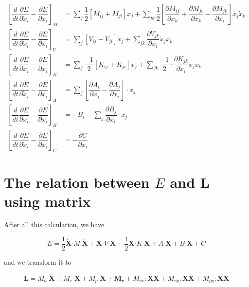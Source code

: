 \documentclass[a4paper]{article}
\newcommand{\vvector}[1]{\pmb{#1}}
\newcommand{\tensor}[1]{#1}
\newcommand{\inner}{\pmb{\cdot}}
\newcommand{\dinner}{\pmb{:}}
\begin{document}
\begin{align*}
\left[\dfrac{d}{dt} \dfrac{\partial E}{\partial \dot{x}_{i}} - \dfrac{\partial E}{\partial x_{i}}\right]_{M} & = \sum_{j} \dfrac{1}{2}\left[M_{ij}+M_{ji}\right] \ddot{x}_{j} + \sum_{jk} \dfrac{1}{2} \left[\dfrac{\partial M_{ij}}{\partial x_{k}} + \dfrac{\partial M_{ji}}{\partial x_{k}} - \dfrac{\partial M_{jk}}{\partial x_{i}}\right] \dot{x}_{j} \dot{x}_{k} \\
\left[\dfrac{d}{dt} \dfrac{\partial E}{\partial \dot{x}_{i}} - \dfrac{\partial E}{\partial x_{i}}\right]_{V} & = \sum_{j} \left[V_{ij}-V_{ji}\right] \dot{x}_{j} + \sum_{jk} \dfrac{\partial V_{jk}}{\partial x_{i}} \dot{x}_{j} x_{k} \\
\left[\dfrac{d}{dt} \dfrac{\partial E}{\partial \dot{x}_{i}} - \dfrac{\partial E}{\partial x_{i}}\right]_{K} & = \sum_{j} \dfrac{-1}{2} \left[K_{ij}+K_{ji}\right] x_{j} + \sum_{jk} \dfrac{-1}{2} \cdot \dfrac{\partial K_{jk}}{\partial x_{i}} x_{j} x_{k} \\
\left[\dfrac{d}{dt} \dfrac{\partial E}{\partial \dot{x}_{i}} - \dfrac{\partial E}{\partial x_{i}}\right]_{A} & = \sum_{j} \left[\dfrac{\partial A_{i}}{\partial x_{j}} - \dfrac{\partial A_{j}}{\partial x_{i}} \right] \cdot \dot{x}_{j} \\
\left[\dfrac{d}{dt} \dfrac{\partial E}{\partial \dot{x}_{i}} - \dfrac{\partial E}{\partial x_{i}}\right]_{B} & = -B_{i} - \sum_{j} \dfrac{\partial B_{j}}{\partial x_{i}} \cdot x_{j} \\
\left[\dfrac{d}{dt} \dfrac{\partial E}{\partial \dot{x}_{i}} - \dfrac{\partial E}{\partial x_{i}}\right]_{C} & = - \dfrac{\partial C}{\partial x_{i}}
\end{align*}


\pagebreak
 
\section{The relation between $E$ and $\vvector{L}$ using matrix}

After all this calculation, we have

$$ 
E = \dfrac{1}{2} \vvector{\dot{X}} \inner \tensor{M} \inner \vvector{\dot{X}} + \vvector{\dot{X}} \inner \tensor{V} \inner \vvector{X} +  
\dfrac{1}{2} \vvector{X} \inner \tensor{K} \inner \vvector{X} + A \inner \vvector{\dot{X}} + B \inner \vvector{X} + C 
$$

and we transform it to

$$
\vvector{L} = M_{a} \inner \vvector{\ddot{X}} + M_{v} \inner \vvector{\dot{X}} + M_{p} \inner \vvector{X} + \vvector{M_{c}} + M_{vv} \dinner \vvector{\dot{X}} \vvector{\dot{X}} + M_{vp} \dinner \vvector{\dot{X}} \vvector{X} + M_{pp} \dinner \vvector{X} \vvector{X}
$$
\end{document}

